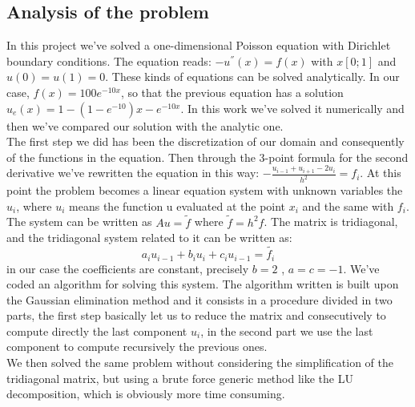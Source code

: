 \documentclass[10pt,a4paper,titlepage]{article}
\begin{document}
\subsection*{Analysis of the problem}
In this project we've solved a one-dimensional Poisson equation with Dirichlet boundary conditions.
The equation reads: $-u^{''}(x)=f(x)$ with $x [0;1]$ and $u(0)=u(1)=0$.
These kinds of equations can be solved analytically. 
In our case, $f(x)=100e^{-10x}$, so that the previous equation has a solution 
$u_e(x)=1 − (1 − e^{−10} )x − e^ {−10x}$.
In this work we've solved it numerically and then we've compared our solution with the analytic one. \\
The first step we did has been the discretization of our domain and consequently of the functions in the equation. Then through the 3-point formula for the second derivative we've rewritten the equation in this way: $-\frac{u_{i-1}+u_{i+1}-2u_{i}}{h^2}=f_i$.
At this point the problem becomes a linear equation system with unknown variables the $u_{i}$, where $u_{i}$ means the function u evaluated at the point $x_{i}$ and the same with $f_{i}$.
The system can be written as $A u = \tilde {f}$ where  $\tilde {f}= h^2 f$. 
The matrix is tridiagonal, and the tridiagonal system related to it can be written as: $$a_iu_{i-1}+b_iu_i+c_iu_{i-1}=\tilde{f_i}$$
in our case the coefficients are constant, precisely $b=2$ , $ a=c=-1$. 
We've coded an algorithm for solving this system. 
The algorithm written is built upon the Gaussian elimination method and it consists in a procedure divided in two parts, the first step basically let us to reduce the matrix and consecutively to compute directly the last component $u_i$, in the second part we use the last component to compute recursively the previous ones. \\
We then solved the same problem without considering the simplification of the tridiagonal matrix, but using a brute force generic method like the LU decomposition, which is obviously more time consuming.
\end{document}
